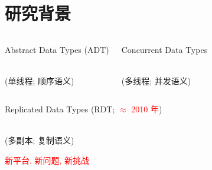 
\section{研究背景}

\begin{frame}{}
  \begin{columns}
      \begin{center}
	Abstract Data Types {(\small \textsc{ADT})} 
	
	 \\[8pt]

	{\small (单线程; 顺序语义)}
      \end{center}

      \vspace{0.20cm}
    \pause
      \begin{center}
	Concurrent Data Types 
	
	 \\[8pt]

	{\small (多线程; 并发语义)}
      \end{center}

      \vspace{0.50cm}
  \end{columns}
\end{frame}

\begin{frame}{}
  \begin{center}
    Replicated Data Types {\small (\textsc{RDT}; \textcolor{red}{$\approx$ 2010 年})} 

     \\[8pt]

    {\small (多副本; 复制语义)}
  \end{center}

  \vspace{0.30cm}

  \pause
  \vspace{0.50cm}
  \centerline{\textcolor{red}{\large 新平台, 新问题, 新挑战}}
\end{frame}

